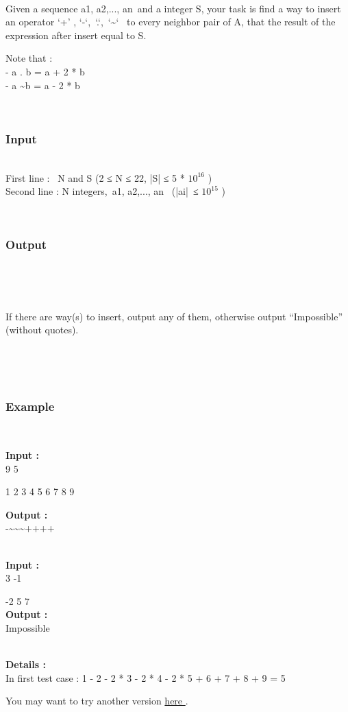 

 

Given a sequence a1, a2,..., an and a integer S, your task is find a way to insert an operator ‘+’ , ‘-‘, ‘.‘, ‘\textasciitilde‘  to every neighbor pair of A, that the result of the expression after insert equal to S.

Note that :
\\- a . b = a + 2 * b
\\- a \textasciitilde b = a - 2 * b

 

\subsubsection{\textbf{\textbf{Input }}}


\\First line :  N and S (2 ≤ N ≤ 22, |S| ≤ 5 * $10^{16}$ )
\\Second line : N integers, a1, a2,..., an  (|ai| ≤ $10^{15}$ )

 

\subsubsection{\textbf{\textbf{Output }}}

 

 

If there are way(s) to insert, output any of them, otherwise output “Impossible” (without quotes).

 

 

\subsubsection{\textbf{Example }}

 

\textbf{Input : }
\\9 5

1 2 3 4 5 6 7 8 9

\textbf{Output : }
\\-\textasciitilde\textasciitilde\textasciitilde++++


\\\textbf{Input : }
\\3 -1

-2 5 7
\\\textbf{Output : }
\\Impossible


\\\textbf{Details : }
\\In first test case : 1 - 2 - 2 * 3 - 2 * 4 - 2 * 5 + 6 + 7 + 8 + 9 = 5

You may want to try another version \href{/problems/show/BLOPER}{ here } .
